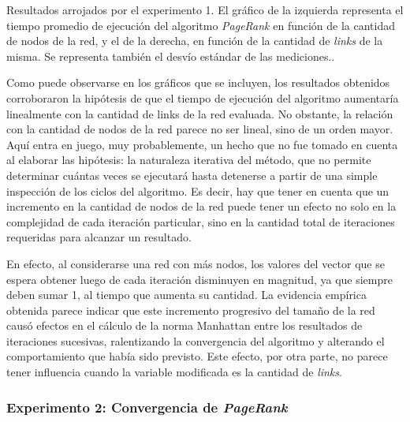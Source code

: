 \begin{minipage}{\textwidth}
\begin{center}
                    \vspace{1em}

                    Resultados arrojados por el experimento 1. El gráfico de la izquierda representa el tiempo promedio de ejecución del algoritmo \emph{PageRank} en función de la cantidad de nodos de la red, y el de la derecha, en función de la cantidad de \emph{links} de la misma. Se representa también el desvío estándar de las mediciones..

                    \vspace{1em}
                \end{center}
            \end{minipage}

            Como puede observarse en los gráficos que se incluyen, los resultados obtenidos corroboraron la hipótesis de que el tiempo de ejecución del algoritmo aumentaría linealmente con la cantidad de links de la red evaluada. No obstante, la relación con la cantidad de nodos de la red parece no ser lineal, sino de un orden mayor. Aquí entra en juego, muy probablemente, un hecho que no fue tomado en cuenta al elaborar las hipótesis: la naturaleza iterativa del método, que no permite determinar cuántas veces se ejecutará hasta detenerse a partir de una simple inspección de los ciclos del algoritmo. Es decir, hay que tener en cuenta que un incremento en la cantidad de nodos de la red puede tener un efecto no solo en la complejidad de cada iteración particular, sino en la cantidad total de iteraciones requeridas para alcanzar un resultado.

            En efecto, al considerarse una red con más nodos, los valores del vector que se espera obtener luego de cada iteración disminuyen en magnitud, ya que siempre deben sumar 1, al tiempo que aumenta su cantidad. La evidencia empírica obtenida parece indicar que este incremento progresivo del tamaño de la red causó efectos en el cálculo de la norma Manhattan entre los resultados de iteraciones sucesivas, ralentizando la convergencia del algoritmo y alterando el comportamiento que había sido previsto. Este efecto, por otra parte, no parece tener influencia cuando la variable modificada es la cantidad de \emph{links}.

        \subsubsection{Experimento 2: Convergencia de \emph{PageRank}}

